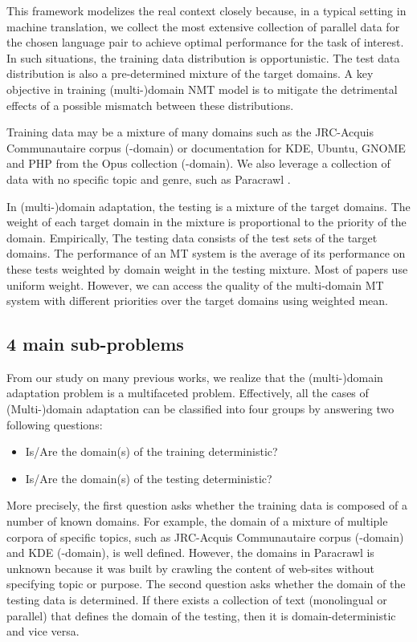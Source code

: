 This framework modelizes the real context closely because, in a typical setting in machine translation, we collect the most extensive collection of parallel data for the chosen language pair to achieve optimal performance for the task of interest. In such situations, the training data distribution is opportunistic. The test data distribution is also a pre-determined mixture of the target domains. A key objective in training (multi-)domain NMT model is to mitigate the detrimental effects of a possible mismatch between these distributions. 

Training data may be a mixture of many domains such as the JRC-Acquis Communautaire corpus (-domain) \citep{Steinberger06acquis} or documentation for KDE, Ubuntu, GNOME and PHP from the Opus collection \citep{Tiedemann09news} (-domain). We also leverage a collection of data with no specific topic and genre, such as Paracrawl \citep{Banon20Paracrawl}. 

In (multi-)domain adaptation, the testing is a mixture of the target domains. The weight of each target domain in the mixture is proportional to the priority of the domain. Empirically, The testing data consists of the test sets of the target domains. The performance of an MT system is the average of its performance on these tests weighted by domain weight in the testing mixture. Most of papers use uniform weight. However, we can access the quality of the multi-domain MT system with different priorities over the target domains using weighted mean.

\subsection{4 main sub-problems}
From our study on many previous works, we realize that the (multi-)domain adaptation problem is a multifaceted problem. Effectively, all the cases of (Multi-)domain adaptation can be classified into four groups by answering two following questions:
\begin{itemize}
	\item Is/Are the domain(s) of the training deterministic?
	\item Is/Are the domain(s) of the testing deterministic?
\end{itemize}
More precisely, the first question asks whether the training data is composed of a number of known domains. For example, the domain of a mixture of multiple corpora of specific topics, such as JRC-Acquis Communautaire corpus (-domain) and KDE (-domain), is well defined. However, the domains in Paracrawl \citep{Banon20Paracrawl} is unknown because it was built by crawling the content of web-sites without specifying topic or purpose. The second question asks whether the domain of the testing data is determined. If there exists a collection of text (monolingual or parallel) that defines the domain of the testing, then it is domain-deterministic and vice versa. 

